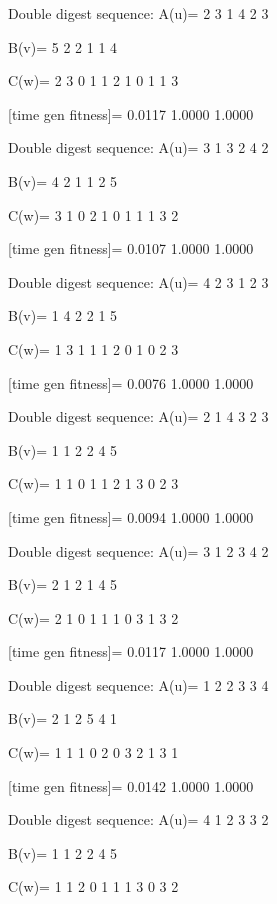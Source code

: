 Double digest sequence:
A(u)=
     2     3     1     4     2     3

B(v)=
     5     2     2     1     1     4

C(w)=
     2     3     0     1     1     2     1     0     1     1     3

[time gen fitness]=
    0.0117    1.0000    1.0000

Double digest sequence:
A(u)=
     3     1     3     2     4     2

B(v)=
     4     2     1     1     2     5

C(w)=
     3     1     0     2     1     0     1     1     1     3     2

[time gen fitness]=
    0.0107    1.0000    1.0000

Double digest sequence:
A(u)=
     4     2     3     1     2     3

B(v)=
     1     4     2     2     1     5

C(w)=
     1     3     1     1     1     2     0     1     0     2     3

[time gen fitness]=
    0.0076    1.0000    1.0000

Double digest sequence:
A(u)=
     2     1     4     3     2     3

B(v)=
     1     1     2     2     4     5

C(w)=
     1     1     0     1     1     2     1     3     0     2     3

[time gen fitness]=
    0.0094    1.0000    1.0000

Double digest sequence:
A(u)=
     3     1     2     3     4     2

B(v)=
     2     1     2     1     4     5

C(w)=
     2     1     0     1     1     1     0     3     1     3     2

[time gen fitness]=
    0.0117    1.0000    1.0000

Double digest sequence:
A(u)=
     1     2     2     3     3     4

B(v)=
     2     1     2     5     4     1

C(w)=
     1     1     1     0     2     0     3     2     1     3     1

[time gen fitness]=
    0.0142    1.0000    1.0000

Double digest sequence:
A(u)=
     4     1     2     3     3     2

B(v)=
     1     1     2     2     4     5

C(w)=
     1     1     2     0     1     1     1     3     0     3     2

